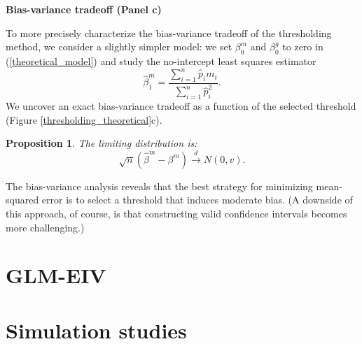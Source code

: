 \documentclass[12pt]{article}
\newtheorem{proposition}{Proposition}
\begin{document}
\begin{center}
	\textbf{Bias-variance tradeoff (Panel c)}
\end{center}


To more precisely characterize the bias-variance tradeoff of the thresholding method, we consider a slightly simpler model: we set $\beta^m_0$ and $\beta^g_0$ to zero in (\ref{theoretical_model}) and study the no-intercept least squares estimator
$$ \hat{\beta}^m_1 =  \frac{ \sum_{i=1}^n \hat{p}_i m_i }{ \sum_{i=1}^n \hat{p}_i^2}.$$ We uncover an exact bias-variance tradeoff as a function of the selected threshold (Figure \ref{thresholding_theoretical}c). 

\begin{proposition}
The limiting distribution is:
$$\sqrt{n}(\hat{\beta}^m - \beta^m) \xrightarrow{d} N(0, v).$$
\end{proposition}

The bias-variance analysis reveals that the best strategy for minimizing mean-squared error is to select a threshold that induces moderate bias. (A downside of this approach, of course, is that constructing valid confidence intervals becomes more challenging.)



\section{GLM-EIV}

\section{Simulation studies}
\end{document}
